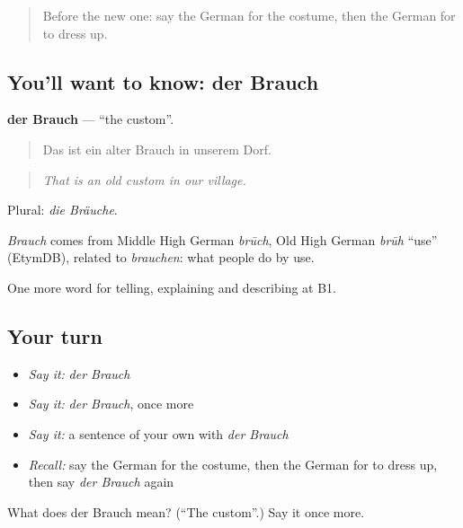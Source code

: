 \label{lesson:GE-C310-brauch}



\begin{quote}
Before the new one: say the German for the costume, then the German for to dress up.
\end{quote}

\subsection*{You'll want to know: der Brauch}
\textbf{der Brauch} — \textquotedblleft{}the custom\textquotedblright{}.

\begin{quote}
Das ist ein alter Brauch in unserem Dorf.
\end{quote}

\begin{quote}
\emph{That is an old custom in our village.}
\end{quote}

Plural: \emph{die Bräuche}.

\begin{cousinweb}
\emph{Brauch} comes from Middle High German \emph{brūch}, Old High German \emph{brūh} \textquotedblleft{}use\textquotedblright{} (EtymDB), related to \emph{brauchen}: what people do by use.
\end{cousinweb}

\begin{grammarlens}[title={What you've built}]
One more word for telling, explaining and describing at B1.
\end{grammarlens}

\subsection*{Your turn}
\begin{itemize}
\raggedright
  \item \emph{Say it:} \emph{der Brauch}
  \item \emph{Say it:} \emph{der Brauch}, once more
  \item \emph{Say it:} a sentence of your own with \emph{der Brauch}
  \item \emph{Recall:} say the German for the costume, then the German for to dress up, then say \emph{der Brauch} again
\end{itemize}

\begin{tcolorbox}[breakable,colback=teal!4,colframe=teal!35!black,title={Before you move on}]
What does der Brauch mean? (\textquotedblleft{}The custom\textquotedblright{}.) Say it once more.
\end{tcolorbox}
